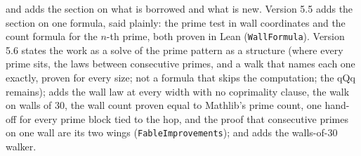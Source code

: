 \documentclass[11pt]{article}
\begin{document}
and adds the section on what is borrowed and what is new. Version 5.5 adds the section on one formula, said plainly: the prime test in wall coordinates and the count formula for the $n$-th prime, both proven in Lean (\texttt{WallFormula}). Version 5.6 states the work as a solve of the prime pattern as a structure (where every prime sits, the laws between consecutive primes, and a walk that names each one exactly, proven for every size; not a formula that skips the computation; the qQq remains); adds the wall law at every width with no coprimality clause, the walk on walls of $30$, the wall count proven equal to Mathlib's prime count, one hand-off for every prime block tied to the hop, and the proof that consecutive primes on one wall are its two wings (\texttt{FableImprovements}); and adds the walls-of-$30$ walker.
\end{document}
